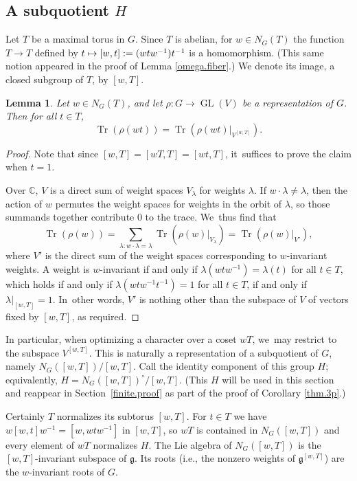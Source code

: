 \documentclass[JEP,XML,SOM,Unicode,NoFloatCountersInSection,published]{cedram}
\newcommand\mto{\mathchoice{\longmapsto}{\mapsto}{\mapsto}{\mapsto}}
\newtheorem{lem}[equation]{Lemma}
\theoremstyle{definition}
\let\ic\circ
\newcommand{\mfg}{\mathfrak{g}}
\newcommand{\C}{\mathbb{C}}
\DeclareMathOperator{\GL}{GL}
\DeclareMathOperator{\Tr}{Tr}
\begin{document}
\subsection*{A subquotient \texorpdfstring{$H$}{H}}
Let $T$ be a maximal torus in $G$.
Since $T$ is abelian, for $w \in N_G(T)$ the function $T \to T$ defined by $t \mto [w, t] := (w t w^{-1}) t^{-1}$ is a homomorphism. (This same notion appeared in the proof of Lemma \ref{omega.fiber}.) We denote its image, a closed subgroup of $T$, by $[w, T]$.

\begin{lem} \label{wT.trace}
Let $w\in N_G(T)$, and let $\rho:G\to \GL(V)$ be a representation of $G$. Then for all $t\in T$,
\[
\Tr(\rho(wt)) = \Tr(\rho(wt)|_{V^{[w,T]}}).
\]
\end{lem}

\begin{proof}
Note that since $[w,T]=[wT,T]=[wt,T]$, it~suffices to prove the claim when $t=1$.

Over $\C$, $V$ is a direct sum of weight spaces $V_\lambda$ for weights $\lambda$. If $w\cdot\lambda\ne \lambda$, then the action of $w$ permutes the weight spaces for weights in the orbit of $\lambda$, so those summands together contribute 0 to the trace. We~thus find that
\[
\Tr(\rho(w)) = \sum_{\lambda:w\cdot \lambda=\lambda} \Tr(\rho(w)|_{V_\lambda}) = \Tr(\rho(w)|_{V'}),
\]
where $V'$ is the direct sum of the weight spaces corresponding to $w$-invariant weights. A weight is $w$-invariant if and only if $\lambda(w t w^{-1})=\lambda(t)$ for all $t\in T$, which holds if and only if $\lambda(w t w^{-1}t^{-1}) = 1$ for all $t\in T$, if and only if $\lambda|_{[w,T]}=1$. In~other words, $V'$ is nothing other than the subspace of $V$ of vectors fixed by $[w,T]$, as required.
\end{proof}

In particular, when optimizing a character over a coset $wT$, we~may restrict to the subspace $V^{[w,T]}$. This is naturally a representation of a subquotient of $G$, namely $N_G([w,T])/[w,T]$. Call the identity component of this group $H$; equivalently, $H = N_G([w,T])^\ic / [w,T]$. (This $H$ will be used in this section and reappear in Section~\ref{finite.proof} as part of the proof of Corollary \ref{thm.3p}.)

Certainly $T$ normalizes its subtorus $[w,T]$. For $t \in T$ we have
$w[w,t]w^{-1} = [w, wtw^{-1}]$ in $[w,T]$, so $wT$ is contained in $N_G([w,T])$ and every element of $wT$ normalizes $H$.
The Lie algebra of $N_G([w,T])$ is the $[w,T]$-invariant subspace of $\mfg$. Its roots (i.e., the nonzero weights of $\mfg^{[w,T]}$) are the $w$-invariant roots of $G$.
\end{document}
